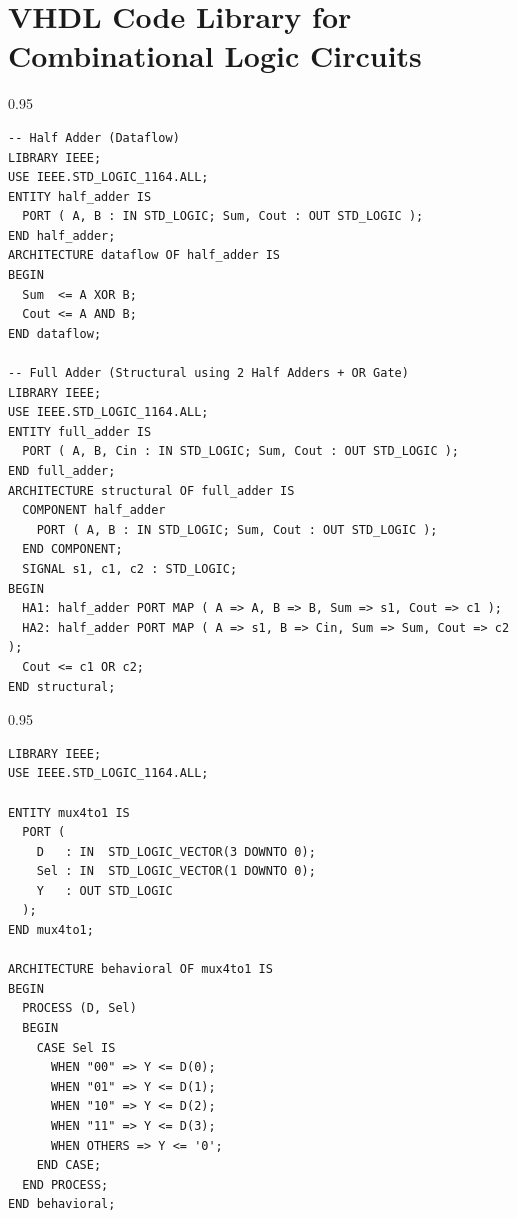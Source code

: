 \documentclass[12pt,a4paper]{article}
\begin{document}
\section{VHDL Code Library for Combinational Logic Circuits}

\begin{tcolorbox}[examplebox, title={1. Half Adder and Full Adder (Dataflow, Behavioral, Structural)}]
\begin{spacing}{0.95}
\begin{verbatim}
-- Half Adder (Dataflow)
LIBRARY IEEE;
USE IEEE.STD_LOGIC_1164.ALL;
ENTITY half_adder IS
  PORT ( A, B : IN STD_LOGIC; Sum, Cout : OUT STD_LOGIC );
END half_adder;
ARCHITECTURE dataflow OF half_adder IS
BEGIN
  Sum  <= A XOR B;
  Cout <= A AND B;
END dataflow;

-- Full Adder (Structural using 2 Half Adders + OR Gate)
LIBRARY IEEE;
USE IEEE.STD_LOGIC_1164.ALL;
ENTITY full_adder IS
  PORT ( A, B, Cin : IN STD_LOGIC; Sum, Cout : OUT STD_LOGIC );
END full_adder;
ARCHITECTURE structural OF full_adder IS
  COMPONENT half_adder
    PORT ( A, B : IN STD_LOGIC; Sum, Cout : OUT STD_LOGIC );
  END COMPONENT;
  SIGNAL s1, c1, c2 : STD_LOGIC;
BEGIN
  HA1: half_adder PORT MAP ( A => A, B => B, Sum => s1, Cout => c1 );
  HA2: half_adder PORT MAP ( A => s1, B => Cin, Sum => Sum, Cout => c2 );
  Cout <= c1 OR c2;
END structural;
\end{verbatim}
\end{spacing}
\end{tcolorbox}

\begin{tcolorbox}[examplebox, title={2. 4-to-1 Multiplexer (Dataflow and Behavioral)}]
\begin{spacing}{0.95}
\begin{verbatim}
LIBRARY IEEE;
USE IEEE.STD_LOGIC_1164.ALL;

ENTITY mux4to1 IS
  PORT (
    D   : IN  STD_LOGIC_VECTOR(3 DOWNTO 0);
    Sel : IN  STD_LOGIC_VECTOR(1 DOWNTO 0);
    Y   : OUT STD_LOGIC
  );
END mux4to1;

ARCHITECTURE behavioral OF mux4to1 IS
BEGIN
  PROCESS (D, Sel)
  BEGIN
    CASE Sel IS
      WHEN "00" => Y <= D(0);
      WHEN "01" => Y <= D(1);
      WHEN "10" => Y <= D(2);
      WHEN "11" => Y <= D(3);
      WHEN OTHERS => Y <= '0';
    END CASE;
  END PROCESS;
END behavioral;
\end{verbatim}
\end{spacing}
\end{tcolorbox}
\end{document}
